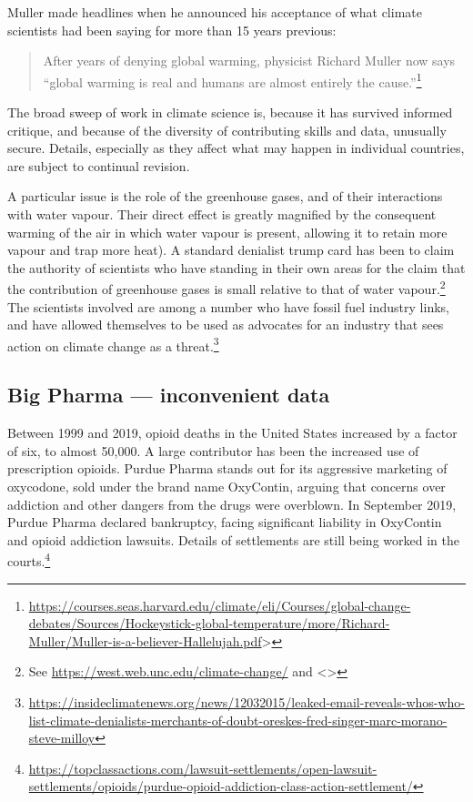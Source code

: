 \documentclass[
  10pt,
  b5paper]{book}
\begin{document}
Muller made headlines when he announced his acceptance of what
climate scientists had been saying for more than 15 years previous:

\begin{quote}
After years of denying global warming, physicist Richard Muller now says ``global warming is real and humans are almost entirely the cause.''\footnote{\url{https://courses.seas.harvard.edu/climate/eli/Courses/global-change-debates/Sources/Hockeystick-global-temperature/more/Richard-Muller/Muller-is-a-believer-Hallelujah.pdf}\textgreater{}}
\end{quote}

The broad sweep of work in climate science is, because it has
survived informed critique, and because of the diversity of
contributing skills and data, unusually secure. Details,
especially as they affect what may happen in individual
countries, are subject to continual revision.

A particular issue is the role of the greenhouse gases, and of
their interactions with water vapour. Their direct effect is
greatly magnified by the consequent warming of the air in which
water vapour is present, allowing it to retain more vapour and trap
more heat). A standard denialist trump card has been to claim the
authority of scientists who have standing in their own areas for
the claim that the contribution of greenhouse gases is small
relative to that of water
vapour.\footnote{See \url{https://west.web.unc.edu/climate-change/} and
  \textless\textgreater{}}
The scientists involved are among a number who have fossil fuel
industry links, and have allowed themselves to be used as
advocates for an industry that sees action on climate change
as a threat.\footnote{\url{https://insideclimatenews.org/news/12032015/leaked-email-reveals-whos-who-list-climate-denialists-merchants-of-doubt-oreskes-fred-singer-marc-morano-steve-milloy}}

\hypertarget{big-pharma-inconvenient-data}{%
\subsection*{Big Pharma --- inconvenient data}\label{big-pharma-inconvenient-data}}

Between 1999 and 2019, opioid deaths in the United States increased
by a factor of six, to almost 50,000.
A large contributor has been the increased use of prescription
opioids. Purdue Pharma stands out for its aggressive marketing of
oxycodone, sold under the brand name OxyContin, arguing that
concerns over addiction and other dangers from the drugs were
overblown. In September 2019, Purdue Pharma declared bankruptcy,
facing significant liability in OxyContin and opioid addiction
lawsuits. Details of settlements are still being worked in the
courts.\footnote{ \url{https://topclassactions.com/lawsuit-settlements/open-lawsuit-settlements/opioids/purdue-opioid-addiction-class-action-settlement/}}
\end{document}
